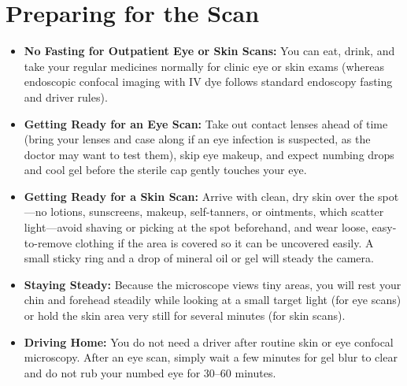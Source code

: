 \section{Preparing for the Scan}
\begin{itemize}
    \item \textbf{No Fasting for Outpatient Eye or Skin Scans:} You can eat, drink, and take your regular medicines normally for clinic eye or skin exams (whereas endoscopic confocal imaging with IV dye follows standard endoscopy fasting and driver rules).
    \item \textbf{Getting Ready for an Eye Scan:} Take out contact lenses ahead of time (bring your lenses and case along if an eye infection is suspected, as the doctor may want to test them), skip eye makeup, and expect numbing drops and cool gel before the sterile cap gently touches your eye.
    \item \textbf{Getting Ready for a Skin Scan:} Arrive with clean, dry skin over the spot---no lotions, sunscreens, makeup, self-tanners, or ointments, which scatter light---avoid shaving or picking at the spot beforehand, and wear loose, easy-to-remove clothing if the area is covered so it can be uncovered easily. A small sticky ring and a drop of mineral oil or gel will steady the camera.
    \item \textbf{Staying Steady:} Because the microscope views tiny areas, you will rest your chin and forehead steadily while looking at a small target light (for eye scans) or hold the skin area very still for several minutes (for skin scans).
    \item \textbf{Driving Home:} You do not need a driver after routine skin or eye confocal microscopy. After an eye scan, simply wait a few minutes for gel blur to clear and do not rub your numbed eye for 30--60 minutes.
\end{itemize}

